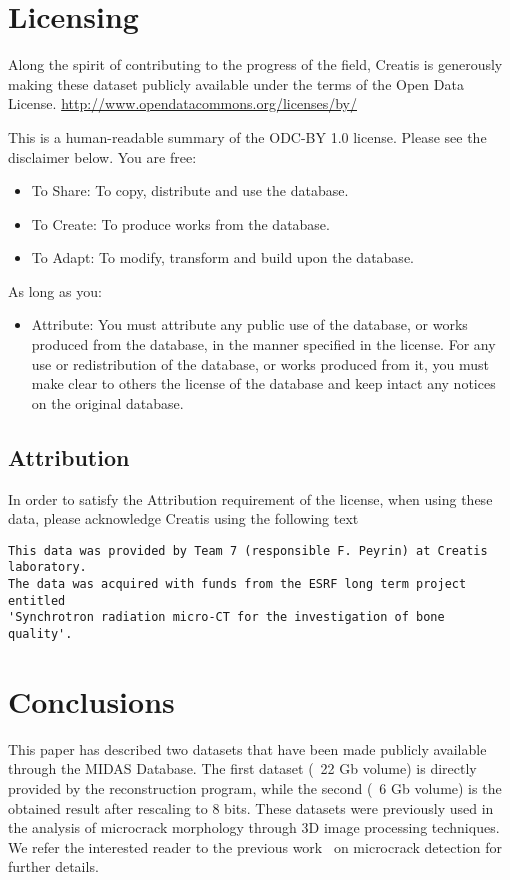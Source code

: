 \documentclass{InsightArticle}
\begin{document}
\section{Licensing}

Along the spirit of contributing to the progress of the field, Creatis is
generously making these dataset publicly available under the terms of the Open
Data License.
\url{http://www.opendatacommons.org/licenses/by/}

This is a human-readable summary of the ODC-BY 1.0 license. Please see the disclaimer below.
You are free:\\

\begin{itemize}
\item To Share: To copy, distribute and use the database.
\item To Create: To produce works from the database.
\item To Adapt: To modify, transform and build upon the database.
\end{itemize}

As long as you:\\

\begin{itemize}
\item Attribute: You must attribute any public use of the database, or works
produced from the database, in the manner specified in the license. For any use
or redistribution of the database, or works produced from it, you must make
clear to others the license of the database and keep intact any notices on the
original database.
\end{itemize}


\subsection{Attribution}

In order to satisfy the Attribution requirement of the license, when using
these data, please acknowledge Creatis using the following text

\begin{verbatim}
This data was provided by Team 7 (responsible F. Peyrin) at Creatis laboratory.
The data was acquired with funds from the ESRF long term project entitled
'Synchrotron radiation micro-CT for the investigation of bone quality'.
\end{verbatim}

\section{Conclusions}
This paper has described two datasets that have been made publicly available
through the MIDAS Database. The first dataset  (~22 Gb volume) is directly
provided by the reconstruction program, while the second (~6 Gb volume) is the
obtained result after rescaling to 8 bits. These datasets were previously used in
the analysis of microcrack morphology through 3D image processing techniques. 
We refer the interested reader to the previous work~\cite{Larrue2011} on
microcrack detection for further details.
\end{document}
